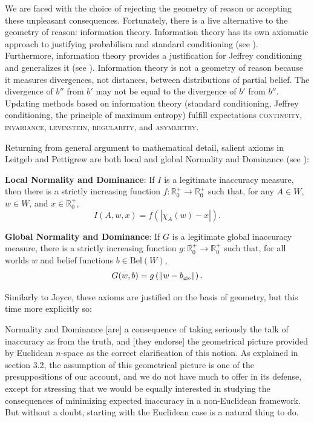 \documentclass[11pt]{article}
\begin{document}
We are faced with the choice of rejecting the geometry of reason or
accepting these unpleasant consequences. Fortunately, there is a live
alternative to the geometry of reason: information theory. Information
theory has its own axiomatic approach to justifying probabilism and
standard conditioning (see ). Furthermore,
information theory provides a justification for Jeffrey conditioning
and generalizes it (see ). Information theory is
not a geometry of reason because it measures divergences, not
distances, between distributions of partial belief. The divergence of
$b''$ from $b'$ may not be equal to the divergence of $b'$ from $b''$.
Updating methods based on information theory (standard conditioning,
Jeffrey conditioning, the principle of maximum entropy) fulfill
expectations \textsc{continuity}, \textsc{invariance},
\textsc{levinstein}, \textsc{regularity}, and \textsc{asymmetry}.

Returning from general argument to mathematical detail, salient axioms
in Leitgeb and Pettigrew are both local and global Normality and
Dominance (see ):

\begin{quotex}
  \textbf{Local Normality and Dominance}: If $I$ is a legitimate
  inaccuracy measure, then there is a strictly increasing function
  $f:\mathbb{R}^{+}_{0}\rightarrow\mathbb{R}^{+}_{0}$ such that, for
  any $A\in{}W$, $w\in{}W$, and $x\in\mathbb{R}^{+}_{0}$,
  \begin{equation}
    \label{eq:e4}
    I(A,w,x)=f\left(|\chi_{A}(w)-x|\right).
  \end{equation}
\end{quotex}

\begin{quotex}
  \textbf{Global Normality and Dominance}: If $G$ is a legitimate
  global inaccuracy measure, there is a strictly increasing function
  $g:\mathbb{R}^{+}_{0}\rightarrow\mathbb{R}^{+}_{0}$ such that, for
  all worlds $w$ and belief functions $b\in{}\mbox{Bel}(W)$,
  \begin{equation}
    \label{eq:e5}
  G(w,b)=g\left(\|w-b_{\mbox{{\tiny glo}}}\|\right).
  \end{equation}
\end{quotex}

Similarly to Joyce, these axioms are justified on the basis of
geometry, but this time more explicitly so:

\begin{quotex}
  Normality and Dominance [are] a consequence of taking seriously the
  talk of inaccuracy as  from the truth, and [they
  endorse] the geometrical picture provided by Euclidean $n$-space as
  the correct clarification of this notion. As explained in section
  3.2, the assumption of this geometrical picture is one of the
  presuppositions of our account, and we do not have much to offer in
  its defense, except for stressing that we would be equally
  interested in studying the consequences of minimizing expected
  inaccuracy in a non-Euclidean framework. But without a doubt,
  starting with the Euclidean case is a natural thing to do.
\end{quotex}
\end{document}

